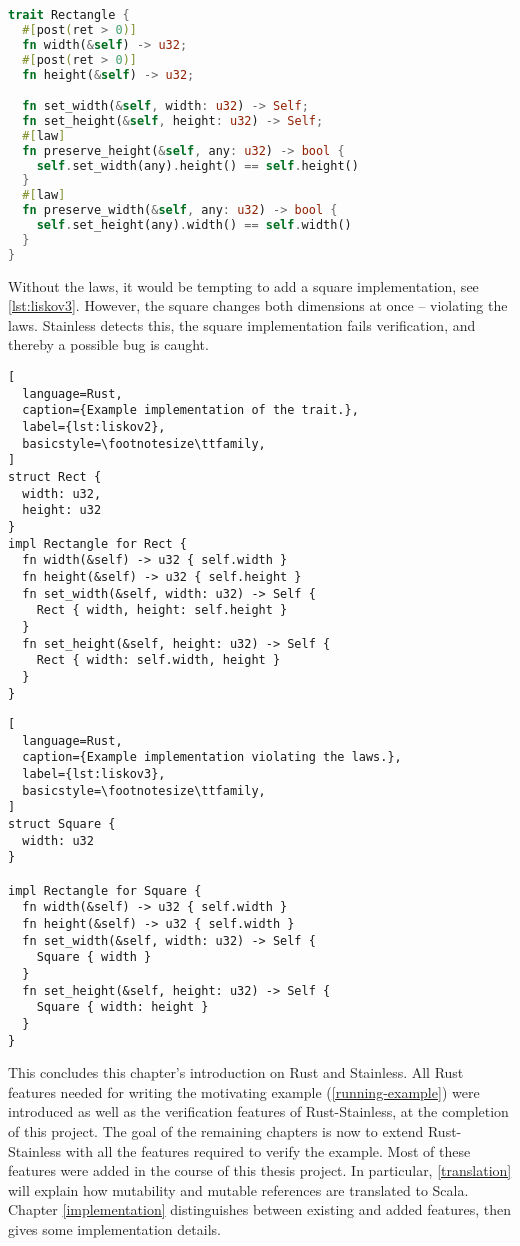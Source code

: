 \begin{lstlisting}[language=Rust, caption={Example trait with laws.}, label={lst:liskov1}]
trait Rectangle {
  #[post(ret > 0)]
  fn width(&self) -> u32;
  #[post(ret > 0)]
  fn height(&self) -> u32;

  fn set_width(&self, width: u32) -> Self;
  fn set_height(&self, height: u32) -> Self;
  #[law]
  fn preserve_height(&self, any: u32) -> bool {
    self.set_width(any).height() == self.height()
  }
  #[law]
  fn preserve_width(&self, any: u32) -> bool {
    self.set_height(any).width() == self.width()
  }
}
\end{lstlisting}

Without the laws, it would be tempting to add a square implementation, see
\autoref{lst:liskov3}. However, the square changes both dimensions at once --
violating the laws. Stainless detects this, the square implementation fails
verification, and thereby a possible bug is caught.

\noindent
\begin{minipage}[t]{.49\textwidth}
\begin{lstlisting}[
  language=Rust,
  caption={Example implementation of the trait.},
  label={lst:liskov2},
  basicstyle=\footnotesize\ttfamily,
]
struct Rect {
  width: u32,
  height: u32
}
impl Rectangle for Rect {
  fn width(&self) -> u32 { self.width }
  fn height(&self) -> u32 { self.height }
  fn set_width(&self, width: u32) -> Self {
    Rect { width, height: self.height }
  }
  fn set_height(&self, height: u32) -> Self {
    Rect { width: self.width, height }
  }
}
\end{lstlisting}
\end{minipage}\hfill
\begin{minipage}[t]{.49\textwidth}
\begin{lstlisting}[
  language=Rust,
  caption={Example implementation violating the laws.},
  label={lst:liskov3},
  basicstyle=\footnotesize\ttfamily,
]
struct Square {
  width: u32
}

impl Rectangle for Square {
  fn width(&self) -> u32 { self.width }
  fn height(&self) -> u32 { self.width }
  fn set_width(&self, width: u32) -> Self {
    Square { width }
  }
  fn set_height(&self, height: u32) -> Self {
    Square { width: height }
  }
}
\end{lstlisting}
\end{minipage}

\hfill \break \noindent This concludes this chapter's introduction on Rust and
Stainless. All Rust features needed for writing the motivating example
(\autoref{running-example}) were introduced as well as the verification features
of Rust-Stainless, at the completion of this project. The goal of the remaining
chapters is now to extend Rust-Stainless with all the features required to
verify the example. Most of these features were added in the course of this
thesis project. In particular, \autoref{translation} will explain how mutability
and mutable references are translated to Scala. Chapter \ref{implementation}
distinguishes between existing and added features, then gives some
implementation details.


